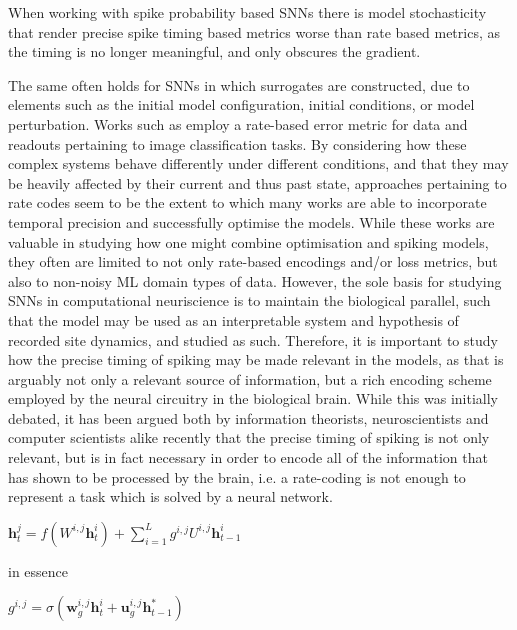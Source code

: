 \documentclass[mphil,deptreport,ianc]{infthesis} %
\begin{document}
When working with spike probability based SNNs there is model stochasticity that render precise spike timing based metrics worse than rate based metrics, as the timing is no longer meaningful, and only obscures the gradient.

The same often holds for SNNs in which surrogates are constructed, due to elements such as the initial model configuration, initial conditions, or model perturbation.
Works such as \cite{Jin2018} employ a rate-based error metric for data and readouts pertaining to image classification tasks.
By considering how these complex systems behave differently under different conditions, and that they may be heavily affected by their current and thus past state, approaches pertaining to rate codes seem to be the extent to which many works are able to incorporate temporal precision and successfully optimise the models.
While these works are valuable in studying how one might combine optimisation and spiking models, they often are limited to not only rate-based encodings and/or loss metrics, but also to non-noisy ML domain types of data.
However, the sole basis for studying SNNs in computational neuriscience is to maintain the biological parallel, such that the model may be used as an interpretable system and hypothesis of recorded site dynamics, and studied as such.
Therefore, it is important to study how the precise timing of spiking may be made relevant in the models, as that is arguably not only a relevant source of information, but a rich encoding scheme employed by the neural circuitry in the biological brain.
While this was initially debated, it has been argued both by information theorists, neuroscientists and computer scientists alike recently that the precise timing of spiking is not only relevant, but is in fact necessary in order to encode all of the information that has shown to be processed by the brain, i.e. a rate-coding is not enough to represent a task which is solved by a neural network.

\begin{math}
    \textbf{h}_t^j = \textit{f}(W^{i,j}\textbf{h}_t^i) + \sum_{i=1}^L g^{i,j} U^{i,j}\textbf{h}_{t-1}^i
\end{math}

in essence

\begin{math}
    g^{i,j} = \sigma ( \textbf{w}_g^{i,j}\textbf{h}_t^{i} + \textbf{u}_g^{i,j}\textbf{h}_{t-1}^{*})
\end{math}
\end{document}
